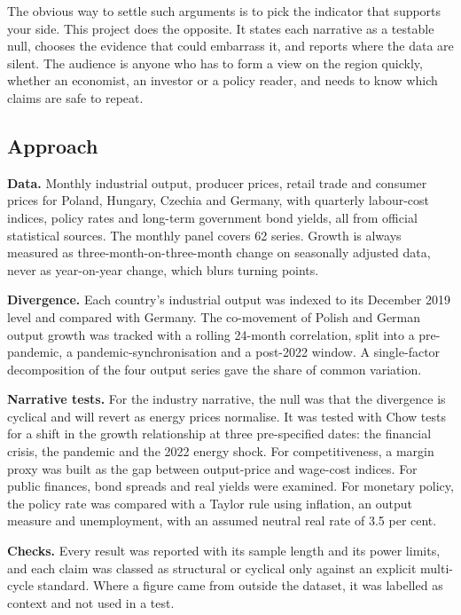 \documentclass[
  british,
  a4paper,
]{article}
\begin{document}
The obvious way to settle such arguments is to pick the indicator that
supports your side. This project does the opposite. It states each
narrative as a testable null, chooses the evidence that could embarrass
it, and reports where the data are silent. The audience is anyone who
has to form a view on the region quickly, whether an economist, an
investor or a policy reader, and needs to know which claims are safe to
repeat.

\subsection{Approach}\label{approach}

\textbf{Data.} Monthly industrial output, producer prices, retail trade
and consumer prices for Poland, Hungary, Czechia and Germany, with
quarterly labour-cost indices, policy rates and long-term government
bond yields, all from official statistical sources. The monthly panel
covers 62 series. Growth is always measured as
three-month-on-three-month change on seasonally adjusted data, never as
year-on-year change, which blurs turning points.

\textbf{Divergence.} Each country's industrial output was indexed to its
December 2019 level and compared with Germany. The co-movement of Polish
and German output growth was tracked with a rolling 24-month
correlation, split into a pre-pandemic, a pandemic-synchronisation and a
post-2022 window. A single-factor decomposition of the four output
series gave the share of common variation.

\textbf{Narrative tests.} For the industry narrative, the null was that
the divergence is cyclical and will revert as energy prices normalise.
It was tested with Chow tests for a shift in the growth relationship at
three pre-specified dates: the financial crisis, the pandemic and the
2022 energy shock. For competitiveness, a margin proxy was built as the
gap between output-price and wage-cost indices. For public finances,
bond spreads and real yields were examined. For monetary policy, the
policy rate was compared with a Taylor rule using inflation, an output
measure and unemployment, with an assumed neutral real rate of 3.5 per
cent.

\textbf{Checks.} Every result was reported with its sample length and
its power limits, and each claim was classed as structural or cyclical
only against an explicit multi-cycle standard. Where a figure came from
outside the dataset, it was labelled as context and not used in a test.
\end{document}
